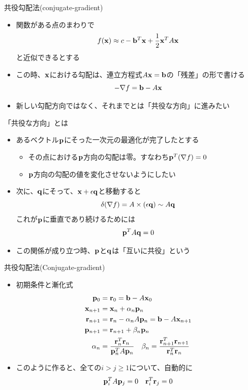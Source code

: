 \begin{frame}[t,fragile]{共役勾配法(conjugate-gradient)}
  \begin{itemize}
    \setlength{\itemsep}{1em}
  \item 関数がある点のまわりで
    \[
    f({\bf x}) \approx c - {\bf b}^T {\bf x} + \frac{1}{2} {\bf x}^T A {\bf x}
    \]
    と近似できるとする
  \item この時、${\bf x}$における勾配は、連立方程式$A{\bf x}={\bf b}$の「残差」の形で書ける
    \[
    -\nabla f = {\bf b} - A {\bf x}
    \]
  \item 新しい勾配方向ではなく、それまでとは「共役な方向」に進みたい
  \end{itemize}
\end{frame}

\begin{frame}[t,fragile]{「共役な方向」とは}
  \begin{itemize}
    \setlength{\itemsep}{1em}
  \item あるベクトル${\bf p}$にそった一次元の最適化が完了したとする
    \begin{itemize}
    \item その点における${\bf p}$方向の勾配は零。すなわち${\bf p}^T (\nabla f)=0$
    \item ${\bf p}$方向の勾配の値を変化させないようにしたい
  \end{itemize}
  \item 次に、${\bf q}$にそって、${\bf x}+\epsilon {\bf q}$と移動すると
    \[
      \delta(\nabla f) = A \times (\epsilon {\bf q}) \sim A {\bf q}
      \]
      これが${\bf p}$に垂直であり続けるためには
    \[
      {\bf p}^T A {\bf q} = 0
      \]
    \item この関係が成り立つ時、${\bf p}$と${\bf q}$は「互いに共役」という
  \end{itemize}
\end{frame}

\begin{frame}[t,fragile]{共役勾配法(Conjugate-gradient)}
  \begin{itemize}
    \setlength{\itemsep}{1em}
  \item 初期条件と漸化式
    \begin{align*}
      {\bf p}_0 &= {\bf r}_0 = {\bf b} - A {\bf x}_0 \\
      {\bf x}_{n+1} &= {\bf x}_n + \alpha_n {\bf p}_n \\
      {\bf r}_{n+1} &= {\bf r}_n - \alpha_n A {\bf p}_n = {\bf b} - A {\bf x}_{n+1} \\
      {\bf p}_{n+1} &= {\bf r}_{n+1} + \beta_n {\bf p}_n \\
      \alpha_n &= \frac{{\bf r}_n^T {\bf r}_n}{{\bf p}_n^T A {\bf p}_n} \ \ \
      \beta_n = \frac{{\bf r}_{n+1}^T {\bf r}_{n+1}}{{\bf r}_n^T {\bf r}_n}
    \end{align*}
  \item このように作ると、全ての$i>j \ge 1$について、自動的に
    \[
      {\bf p}_i^T A {\bf p}_j = 0 \ \ \ {\bf r}_i^T {\bf r}_j = 0
      \]
  \end{itemize}
\end{frame}


